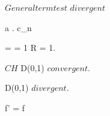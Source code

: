 \documentclass[../Main/main]{subfiles}
\begin{document}
{{{{{{			 		$ General term test $ \imp $ divergent $
			 	}
			}
		}
		}
	}
	
	
	{
		{
			a .
			c_n \as {}
		}
		{
			 =  = 1 \imp R = 1.

			$CH$ \imp D(0,1) $ convergent $.

			\C \setminus D(0,1) $ divergent $.

			f' = f
		}
	}
	
	
	
	
	
	


	


	
	

	
	
	
	
	
	
	
	
	
	
	
	
	

	

	
	
	
	
	
	
	
	
	
	


	
	
	
	
	
	
	



}
\end{document}
